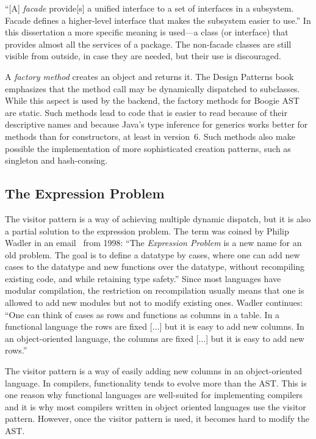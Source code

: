 \documentclass[a4paper]{article}
\theoremstyle{slanted}
\theoremstyle{definition}
\theoremstyle{remark}
\begin{document}
``[A] \emph{facade} provide[s] a unified interface to a set
of interfaces in a subsystem. Facade defines a higher-level
interface that makes the subsystem easier to use.'' In this
dissertation a more specific meaning is used---a class (or
interface) that provides almost all the services of a package.
The non-facade classes are still visible from outside, in case
they are needed, but their use is discouraged.

A \emph{factory method} creates an object and returns it. The
Design Patterns book emphasizes that the method call may be
dynamically dispatched to subclasses. While this aspect is used
by the backend, the factory methods for Boogie AST are static.
Such methods lead to code that is easier to read because of their
descriptive names and because Java's type inference for generics
works better for methods than for constructors, at least in
version~6. Such methods also make possible the implementation
of more sophisticated creation patterns, such as singleton and
hash-consing.

\subsection{The Expression Problem}

The visitor pattern is a way of achieving multiple dynamic
dispatch, but it is also a partial solution to the
expression problem. The term was coined by Philip Wadler in an
email~\cite{wadler1998ep} from 1998: ``The \emph{Expression
Problem} is a new name for an old problem. The goal is to define
a datatype by cases, where one can add new cases to the datatype
and new functions over the datatype, without recompiling existing
code, and while retaining type safety.'' Since most languages
have modular compilation, the restriction on recompilation
usually means that one is allowed to add new modules but not to
modify existing ones. Wadler continues: ``One can think of cases
as rows and functions as columns in a table. In a functional
language the rows are fixed [$\ldots$] but it is easy to add new
columns. In an object-oriented language, the columns are fixed
[$\ldots$] but it is easy to add new rows.''

The visitor pattern is a way of easily adding new columns in
an object-oriented language. In compilers, functionality tends
to evolve more than the AST. This is one reason why functional
languages are well-suited for implementing compilers and it is
why most compilers written in object oriented languages use the
visitor pattern. However, once the visitor pattern is used, it
becomes hard to modify the AST.
\end{document}
